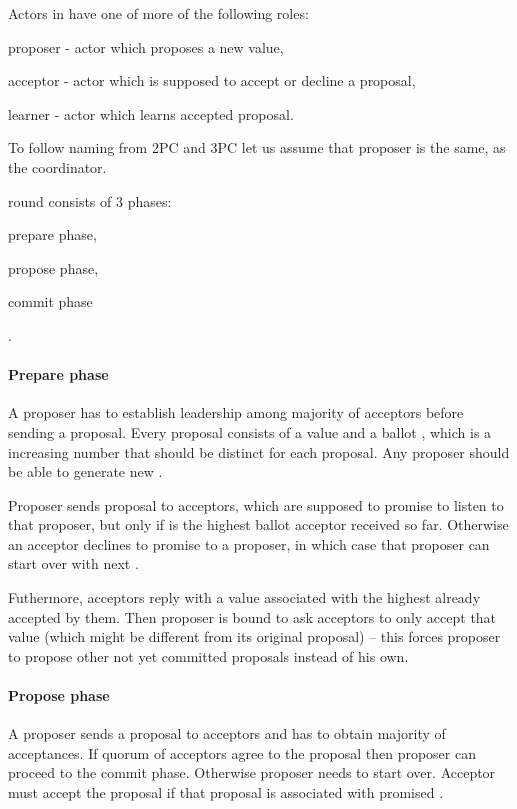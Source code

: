 Actors in \paxos have one of more of the following roles: \begin{enumerate*}
\item proposer - actor which proposes a new value,
\item acceptor - actor which is supposed to accept or decline a proposal,
\item learner - actor which learns accepted proposal.
\end{enumerate*} To follow naming from 2PC and 3PC let us assume that proposer is the same, as the coordinator.

\paxos round consists of $3$ phases: \begin{enumerate*} \item prepare phase, \item propose phase, \item commit phase \end{enumerate*}.

\paragraph{Prepare phase}
A proposer has to establish leadership among majority of acceptors before sending a proposal. Every proposal consists of a value and a ballot \ballot, which is a increasing number that should be distinct for each proposal. Any proposer should be able to generate new \ballot.

Proposer sends proposal \ballot to acceptors, which are supposed to promise to listen to that proposer, but only if \ballot is the highest ballot acceptor received so far. Otherwise an acceptor declines to promise to a proposer, in which case that proposer can start over with next \ballot. 

Futhermore, acceptors reply with a value associated with the highest \ballot already accepted by them. Then proposer is bound to ask acceptors to only accept that value (which might be different from its original proposal) -- this forces proposer to propose other not yet committed proposals instead of his own.

\paragraph{Propose phase}
A proposer sends a proposal to acceptors and has to obtain majority of acceptances. If quorum of acceptors agree to the proposal then proposer can proceed to the commit phase. Otherwise proposer needs to start over. Acceptor must accept the proposal if that proposal is associated with promised \ballot.

